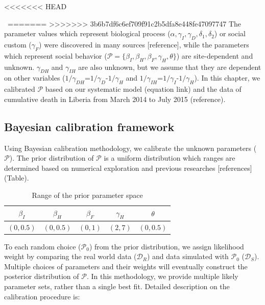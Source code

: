 <<<<<<< HEAD

\label{sec:calibration}
\
=======
>>>>>>> 3b6b7df6c6ef709f91c2b5dfa8e448fe47097747
The parameter values which represent biological process ($\alpha, \gamma_{I}, \gamma_{D}, \delta_{1}, \delta_{2}$) or social custom ($\gamma_{F}$) were discovered in many sources [reference], while the parameters which represent social behavior ($\mathcal{P}=\{\beta_{I}, \beta_{H}, \beta_{F}, \gamma_{H}, \theta\}$) are site-dependent and unknown. $\gamma_{DH}$ and $\gamma_{IH}$ are also unknown, but we assume that they are dependent on other variables ($1/\gamma_{DH}$=$1/\gamma_{D}$-$1/\gamma_{H}$ and $1/\gamma_{IH}$=$1/\gamma_{I}$-$1/\gamma_{H}$). In this chapter, we calibrated $\mathcal{P}$ based on our systematic model (equation link) and the data of cumulative death in Liberia from March 2014 to July 2015 (reference).
\subsection{Bayesian calibration framework}
Using Bayesian calibration methodology, we calibrate the unknown parameters ($\mathcal{P}$). The prior distribution of $\mathcal{P}$ is a uniform distribution which ranges are determined based on numerical exploration and previous researches [references] (Table). \\

\begin{table}[ht]
\caption{Range of the prior parameter space} %
\centering %
\begin{tabular}{c c c c c}
\hline\hline %
$\beta_{I}$ & $\beta_{H}$ & $\beta_{F}$ & $\gamma_{H}$ & $\theta$ \\ [0.5ex]
\hline %
$(0,0.5)$ & $(0,0.5)$ & $(0,1)$ & $(2,7)$ & $(0,0.5)$ \\ [0.5ex]
\hline
\end{tabular}
\label{tab:Prior Ranges}
\end{table}


To each random choice ($\mathcal{P}_0$) from the prior distribution, we assign likelihood weight by comparing the real world data ($\mathcal{D}_R$) and data simulated with $\mathcal{P}_0$ ($\mathcal{D}_S$). Multiple choices of parameters and their weights will eventually construct the posterior distribution of $\mathcal{P}$. In this methodology, we provide multiple likely parameter sets, rather than a single best fit. Detailed description on the calibration procedure is:\\

